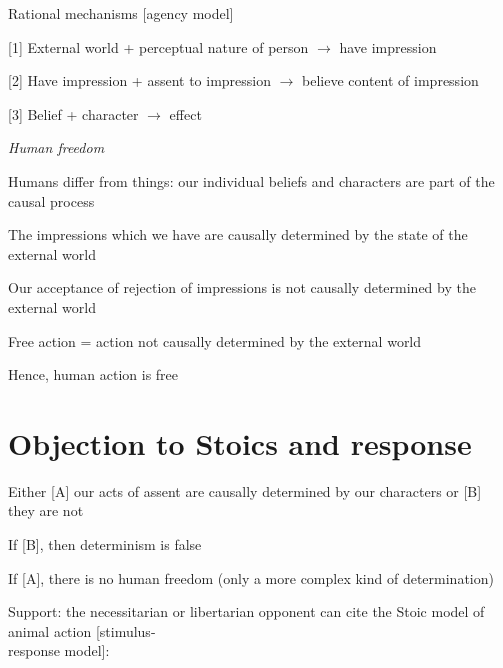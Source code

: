 \documentclass[11pt]{article}
\begin{document}
Rational mechanisms [agency model]
\vspace*{1mm}

\hspace*{5mm} [1] External world + perceptual nature of person $\rightarrow$ have impression
\vspace*{1mm}

\hspace*{5mm} [2] Have impression + assent to impression $\rightarrow$ believe content of impression
\vspace*{1mm}

\hspace*{5mm} [3] Belief + character $\rightarrow$ effect
\vspace*{2mm}

\noindent \emph{Human freedom}
\vspace*{2mm}

\noindent Humans differ from things: our individual beliefs and characters are part of the causal process
\vspace*{1mm}

\noindent The impressions which we have are causally determined by the state of the external world
\vspace*{1mm}

\noindent Our acceptance of rejection of impressions is not causally determined by the external world
\vspace*{1mm}

\noindent Free action = action not causally determined by the external world
\vspace*{1mm}

\noindent Hence, human action is free
\vspace*{-3mm}

\section*{Objection to Stoics and response}

\noindent Either [A] our acts of assent are causally determined by our characters or [B] they are not
\vspace*{1mm}

\noindent If [B], then determinism is false
\vspace*{1mm}

\noindent If [A], there is no human freedom (only a more complex kind of determination)
\vspace*{1mm}

Support: the necessitarian or libertarian opponent can cite the Stoic model of animal action [stimulus-\\\hspace*{6mm}response model]:
\vspace*{1mm}
\end{document}
